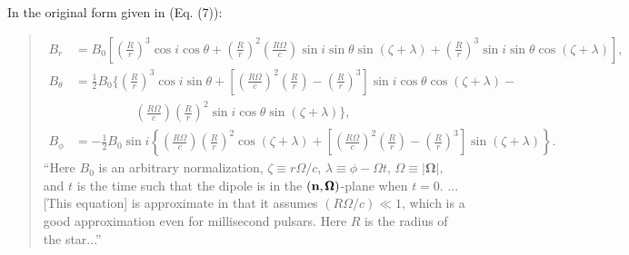 \documentclass{book}
\begin{document}
In the original form given in \citet{Barnard1986} (Eq. (7)):
\begin{quote}
\begin{equation}
    \begin{aligned}
        B_r &= B_0 \left[\left(\frac{R}{r}\right)^3 \cos i \cos \theta +
               \left(\frac{R}{r}\right)^2\left(\frac{R\Omega}{c}\right) \sin i \sin \theta \sin(\zeta + \lambda) +
               \left(\frac{R}{r}\right)^3 \sin i \sin \theta \cos(\zeta + \lambda)\right], \\
        B_\theta &= \frac{1}{2}B_0 \Bigg\{\left(\frac{R}{r}\right)^3 \cos i \sin \theta +
                    \left[\left(\frac{R\Omega}{c}\right)^2\left(\frac{R}{r}\right) - \left(\frac{R}{r}\right)^3\right] \sin i \cos \theta \cos(\zeta + \lambda) - \\
            &\hspace{2cm}
                    \left(\frac{R\Omega}{c}\right)\left(\frac{R}{r}\right)^2 \sin i \cos \theta \sin(\zeta + \lambda)\Bigg\}, \\
        B_\phi &= -\frac{1}{2} B_0 \sin i \left\{\left(\frac{R\Omega}{c}\right)\left(\frac{R}{r}\right)^2 \cos(\zeta + \lambda) +
                  \left[\left(\frac{R\Omega}{c}\right)^2\left(\frac{R}{r}\right) - \left(\frac{R}{r}\right)^3\right] \sin(\zeta + \lambda)\right\}.
    \end{aligned}
\end{equation}
    ``Here $B_0$ is an arbitrary normalization, $\zeta \equiv r\Omega/c$, $\lambda \equiv \phi - \Omega t$, $\Omega \equiv |{\pmb \Omega}|$, and $t$ is the time such that the dipole is in the $({\bf n}, {\pmb \Omega})$-plane when $t = 0$.
    ...
    [This equation] is approximate in that it assumes $(R\Omega/c) \ll 1$, which is a good approximation even for millisecond pulsars.
    Here $R$ is the radius of the star...''
\end{quote}
\end{document}
